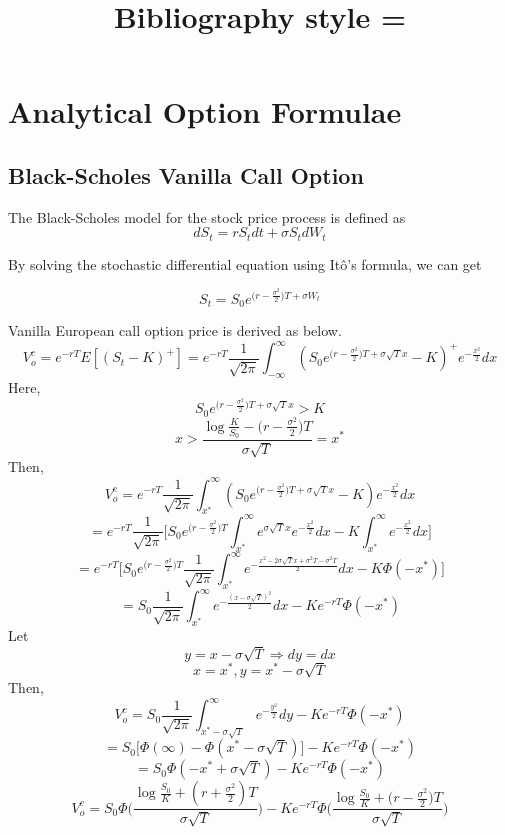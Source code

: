 \documentclass{article}
\title{Bibliography style = \mystyle}
\date{}
\begin{document}
\maketitle

\section{Analytical Option Formulae}
\subsection{Black-Scholes Vanilla Call Option}

The Black-Scholes model for the stock price process is defined as
$$
dS_t = rS_tdt + \sigma S_tdW_t
$$

By solving the stochastic differential equation using It\^{o}'s formula, we can get

$$
S_t = S_0e^{\big(r-\frac{\sigma^2}{2}\big)T+\sigma W_t}
$$

Vanilla European call option price is derived as below.
$$
V_o^{c} = e^{-rT}{E}[(S_t-K)^{+}]
        = e^{-rT}\frac{1}{\sqrt{2\pi}}\int_{-\infty}^{\infty}(S_0e^{\big(r-\frac{\sigma^{2}}{2}\big)T +\sigma\sqrt{T}x}-K)^{+}e^{-\frac{x^{2}}{2}}dx
$$
Here, 
$$S_0e^{\big(r-\frac{\sigma^{2}}{2}\big)T +\sigma\sqrt{T}x} > K$$
$$ 
x > \frac{\log{\frac{K}{S_0}}-\big(r-\frac{\sigma^{2}}{2}\big)T}{\sigma\sqrt{T}} = x^{*}
$$
Then,
$$
V_o^{c} = e^{-rT}\frac{1}{\sqrt{2\pi}}\int_{x^{*}}^{\infty}(S_0e^{\big(r-\frac{\sigma^{2}}{2}\big)T +\sigma\sqrt{T}x}-K)e^{-\frac{x^{2}}{2}}dx
$$$$
= e^{-rT}\frac{1}{\sqrt{2\pi}}\Bigg[S_0e^{\big(r-\frac{\sigma^{2}}{2}\big)T}\int_{x^{*}}^{\infty}e^{\sigma\sqrt{T}x}e^{-\frac{x^{2}}{2}}dx - K\int_{x^{*}}^{\infty}e^{-\frac{x^{2}}{2}}dx\Bigg]
$$$$
= e^{-rT}\Bigg[S_0e^{\big(r-\frac{\sigma^{2}}{2}\big)T}\frac{1}{\sqrt{2\pi}}\int_{x^{*}}^{\infty}e^{-\frac{x^{2}-2\sigma\sqrt{T}x+\sigma^{2}T-\sigma^{2}T}{2}}dx - K\Phi(-x^{*})\Bigg]
$$$$
= S_0\frac{1}{\sqrt{2\pi}}\int_{x^{*}}^{\infty}e^{-\frac{(x-\sigma\sqrt{T})^{2}}{2}}dx - Ke^{-rT}\Phi(-x^{*})
$$
Let 
$$y = x-\sigma\sqrt{T} \Rightarrow dy=dx$$
$$x = x^{*}, y = x^{*}-\sigma\sqrt{T}$$
Then,
$$
V_o^{c} = S_0\frac{1}{\sqrt{2\pi}}\int_{x^{*}-\sigma\sqrt{T}}^{\infty}e^{-\frac{y^{2}}{2}}dy - Ke^{-rT}\Phi(-x^{*})
$$
$$
= S_0\Big[\Phi(\infty)-\Phi(x^{*}-\sigma\sqrt{T})\Big] - Ke^{-rT}\Phi({-x^{*}})
$$$$
= S_0\Phi(-x^{*}+\sigma\sqrt{T}) - Ke^{-rT}\Phi({-x^{*}})
$$$$
V_o^{c} = S_0\Phi\Bigg(\frac{\log{\frac{S_0}{K}}+(r+\frac{\sigma^{2}}{2})T}{\sigma\sqrt{T}}\Bigg) - Ke^{-rT}\Phi\Bigg(\frac{\log{\frac{S_0}{K}}+\big(r-\frac{\sigma^{2}}{2}\big)T}{\sigma\sqrt{T}}\Bigg)
$$
\end{document}
